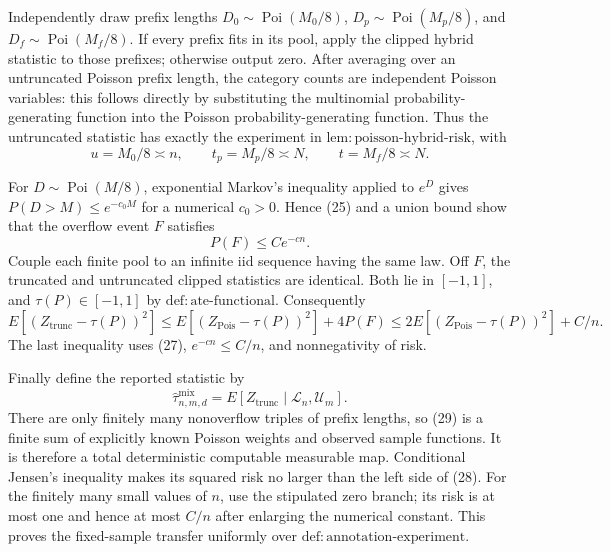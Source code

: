 Independently draw prefix lengths
\(D_0\sim\operatorname{Poi}(M_0/8)\),
\(D_p\sim\operatorname{Poi}(M_p/8)\), and
\(D_f\sim\operatorname{Poi}(M_f/8)\).  If every prefix fits in its
pool, apply the clipped hybrid statistic to those prefixes; otherwise
output zero.  After averaging over an untruncated Poisson prefix
length, the category counts are independent Poisson variables: this
follows directly by substituting the multinomial
probability-generating function into the Poisson
probability-generating function.  Thus the
untruncated statistic has exactly the experiment in
\(\mathrm{lem:poisson\mbox{-}hybrid\mbox{-}risk}\), with
\[
 u=M_0/8\asymp n,\qquad t_p=M_p/8\asymp N,\qquad t=M_f/8\asymp N.  \tag{26}
\]

For \(D\sim\operatorname{Poi}(M/8)\), exponential Markov's inequality
applied to \(e^D\) gives \(P(D>M)\le e^{-c_0M}\) for a numerical
\(c_0>0\).  Hence (25) and a union bound show that the overflow event
\(F\) satisfies
\[
 P(F)\le Ce^{-cn}.                                  \tag{27}
\]
Couple each finite pool to an infinite iid sequence having the same
law.  Off \(F\), the truncated and untruncated clipped statistics are
identical.  Both lie in \([-1,1]\), and
\(\tau(P)\in[-1,1]\) by \(\mathrm{def:ate\mbox{-}functional}\).
Consequently
\[
 E[(Z_{\mathrm{trunc}}-\tau(P))^2]
 \le E[(Z_{\mathrm{Pois}}-\tau(P))^2]+4P(F)
 \le 2E[(Z_{\mathrm{Pois}}-\tau(P))^2]+C/n.         \tag{28}
\]
The last inequality uses (27), \(e^{-cn}\le C/n\), and nonnegativity
of risk.

Finally define the reported statistic by
\[
 \widehat\tau^{\mathrm{mix}}_{n,m,d}
 =E[Z_{\mathrm{trunc}}\mid\mathcal L_n,\mathcal U_m].             \tag{29}
\]
There are only finitely many nonoverflow triples of prefix lengths, so
(29) is a finite sum of explicitly known Poisson weights and observed
sample functions.  It is therefore a total deterministic computable
measurable map.  Conditional Jensen's inequality makes its squared
risk no larger than the left side of (28).  For the finitely many
small values of \(n\), use the stipulated zero branch; its risk is at
most one and hence at most \(C/n\) after enlarging the numerical
constant.  This proves the fixed-sample transfer uniformly over
\(\mathrm{def:annotation\mbox{-}experiment}\).


